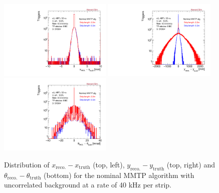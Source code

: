 \begin{figure}[!htpb]
  \begin{center}
    \includegraphics[width=0.48\textwidth]{figures/xres_old.pdf}
    \includegraphics[width=0.48\textwidth]{figures/yres_old.pdf}
    \includegraphics[width=0.48\textwidth]{figures/mres_old.pdf}
  \end{center}
  \vspace{-10pt}
  \caption{Distribution of $x_\text{reco.} - x_\text{truth}$ (top, left), $y_\text{reco.} - y_\text{truth}$ (top, right) and $\theta_\text{reco.} - \theta_\text{truth}$ (bottom) for the nominal MMTP algorithm with uncorrelated background at a rate of 40 kHz per strip.}
  \label{fig:resolutions_old}
\end{figure}
